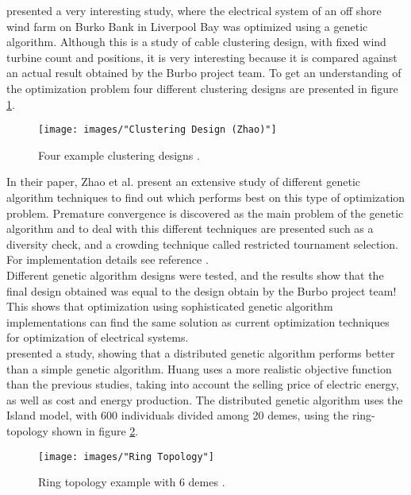 \noindent \cite{Zhao} presented a very interesting study, where the electrical system of an off shore wind farm on Burko Bank in Liverpool Bay was optimized using a genetic algorithm. Although this is a study of cable clustering design, with fixed wind turbine count and positions, it is very interesting because it is compared against an actual result obtained by the Burbo project team. To get an understanding of the optimization problem four different clustering designs are presented in figure \ref{Clustering Design}.\\


\begin{figure}[h!]
\begin{center}
\texttt{[image: images/"Clustering Design (Zhao)"]}
\caption{Four example clustering designs \citep{Zhao}.}
\label{Clustering Design}
\end{center}
\end{figure}


\noindent In their paper, Zhao et al. present an extensive study of different genetic algorithm techniques to find out which performs best on this type of optimization problem. Premature convergence is discovered as the main problem of the genetic algorithm and to deal with this different techniques are presented such as a diversity check, and a crowding technique called restricted tournament selection. For implementation details see reference \citep{Zhao}.\\

\noindent Different genetic algorithm designs were tested, and the results show that the final design obtained was equal to the design obtain by the Burbo project team! This shows that optimization using sophisticated genetic algorithm implementations can find the same solution as current optimization techniques for optimization of electrical systems.\\


\noindent \cite{Huang} presented a study, showing that a distributed genetic algorithm performs better than a simple genetic algorithm. Huang uses a more realistic objective function than the previous studies, taking into account the selling price of electric energy, as well as cost and energy production. The distributed genetic algorithm uses the Island model, with 600 individuals divided among 20 demes, using the ring-topology shown in figure \ref{Ring Topology}.\\

\begin{figure}[h!]
\begin{center}
\texttt{[image: images/"Ring Topology"]}
\caption{Ring topology example with 6 demes \citep{Huang}.}
\label{Ring Topology}
\end{center}
\end{figure}


